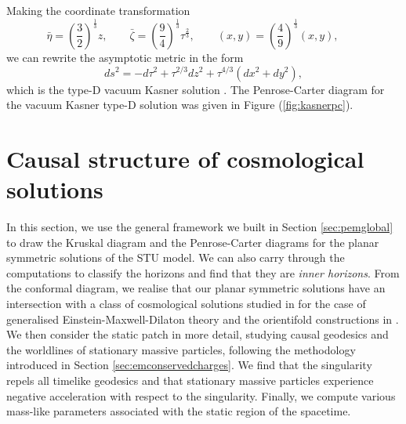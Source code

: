 Making the coordinate transformation
\begin{equation*}
  \bar{\eta} = \left(\frac{3}{2}\right)^{\frac{1}{3}} z, \qquad   \bar{\zeta} = \left(\frac{9}{4}\right)^{\frac{1}{3}} \tau^{\frac{2}{3}}, \qquad   (x,y) = \left(\frac{4}{9}\right)^{\frac{1}{3}} (x,y), \qquad
\end{equation*}
we can rewrite the asymptotic metric in the form
\begin{equation*}
  ds^2 = -d\tau^2 + \tau^{2/3} dz^2 + \tau^{4/3} (dx^2 + dy^2),
\end{equation*}
which is the type-D vacuum Kasner solution \cite{Kasner:1921zz}. The Penrose-Carter diagram for the vacuum Kasner type-D solution was given in Figure (\ref{fig:kasnerpc}).


\section{Causal structure of cosmological solutions}
\label{sec:stucausal}
In this section, we use the general framework we built in Section \ref{sec:pemglobal} to draw the Kruskal diagram and the Penrose-Carter diagrams for the planar symmetric solutions of the STU model. We can also carry through the computations to classify the horizons and find that they are \emph{inner horizons}. From the conformal diagram, we realise that our planar symmetric solutions have an intersection with a class of cosmological solutions studied in \cite{Burgess:2002vu, Burgess:2003mk} for the case of generalised Einstein-Maxwell-Dilaton theory and the orientifold constructions in \cite{Cornalba:2003kd}. We then consider the static patch in more detail, studying causal geodesics and the worldlines of stationary massive particles, following the methodology introduced in Section \ref{sec:emconservedcharges}. We find that the singularity repels all timelike geodesics and that stationary massive particles experience negative acceleration with respect to the singularity. Finally, we compute various mass-like parameters associated with the static region of the spacetime. 

